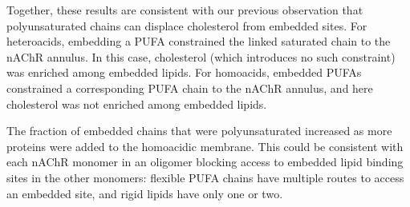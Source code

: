 Together, these results are consistent with our previous \citep{Sharp2019} observation that polyunsaturated chains can displace cholesterol from embedded sites.  For heteroacids,  embedding a PUFA constrained the linked saturated chain to the nAChR annulus. In this case, cholesterol (which introduces no such constraint) was enriched among embedded lipids.  For homoacids, embedded PUFAs constrained a corresponding PUFA chain to the nAChR annulus, and here cholesterol was not enriched among embedded lipids. 

The fraction of embedded chains that were polyunsaturated increased as more proteins were added to the homoacidic membrane. This could be consistent with each nAChR monomer in an oligomer blocking access to embedded lipid binding sites in the other monomers: flexible PUFA chains have multiple routes to access an embedded site, and rigid lipids have only one or two.  %

